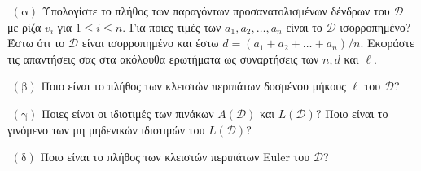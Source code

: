\documentclass[oneside,a4paper]{article}
\newcommand {\tl}{\textlatin}
\begin{document}
$ $\newline
$(\text{α})$ Υπολογίστε το πλήθος των παραγόντων προσανατολισμένων δένδρων του $\mathcal{D}$ με ρίζα $v_i$ για $1\leq i \leq n$. Για ποιες τιμές των $a_1,a_2,\ldots,a_n$ είναι το $\mathcal{D}$ ισορροπημένο? \\

Έστω ότι το $\mathcal{D}$ είναι ισορροπημένο και έστω $d = (a_1 + a_2 + \ldots + a_n)/n$. Εκφράστε τις απαντήσεις σας στα ακόλουθα ερωτήματα ως συναρτήσεις των $n,d$ και $\ell$.

$ $\newline
$(\text{β})$ Ποιο είναι το πλήθος των κλειστών περιπάτων δοσμένου μήκους $\ell$ του $\mathcal{D}$?

$ $\newline
$(\text{γ})$ Ποιες είναι οι ιδιοτιμές των πινάκων $A(\mathcal{D})$ και $L(\mathcal{D})$? Ποιο είναι το γινόμενο των μη μηδενικών ιδιοτιμών του $L(\mathcal{D})$?

$ $\newline
$(\text{δ})$ Ποιο είναι το πλήθος των κλειστών περιπάτων \tl{Euler} του $\mathcal{D}$?
\end{document}
